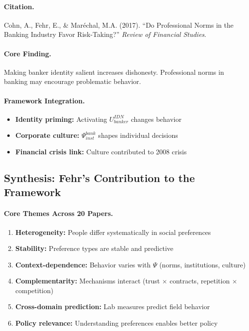 \documentclass[12pt,a4paper]{article}
\begin{document}
\paragraph{Citation.}
Cohn, A., Fehr, E., \& Mar\'echal, M.A. (2017).
``Do Professional Norms in the Banking Industry Favor Risk-Taking?''
\emph{Review of Financial Studies}.

\paragraph{Core Finding.}
Making banker identity salient increases dishonesty. Professional norms
in banking may encourage problematic behavior.

\paragraph{Framework Integration.}
\begin{itemize}
  \item \textbf{Identity priming:} Activating $U^{IDN}_{banker}$ changes behavior
  \item \textbf{Corporate culture:} $\Psi_{inst}^{bank}$ shapes individual decisions
  \item \textbf{Financial crisis link:} Culture contributed to 2008 crisis
\end{itemize}

\subsection{Synthesis: Fehr's Contribution to the Framework}

\paragraph{Core Themes Across 20 Papers.}

\begin{enumerate}
  \item \textbf{Heterogeneity:} People differ systematically in social preferences
  \item \textbf{Stability:} Preference types are stable and predictive
  \item \textbf{Context-dependence:} Behavior varies with $\Psi$ (norms, institutions, culture)
  \item \textbf{Complementarity:} Mechanisms interact (trust $\times$ contracts, repetition $\times$ competition)
  \item \textbf{Cross-domain prediction:} Lab measures predict field behavior
  \item \textbf{Policy relevance:} Understanding preferences enables better policy
\end{enumerate}
\end{document}
